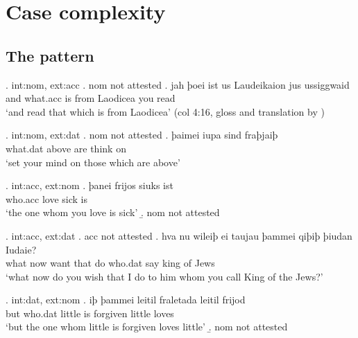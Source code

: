 
\chapter{Case complexity}

\section{The pattern}

\ex. \ac{int}:\ac{nom}, \ac{ext}:\ac{acc}
\a. \ac{nom} not attested
\bg. jah þoei ist us Laudeikaion jus ussiggwaid\\
 and what.\ac{acc} is\scsub{[nom]} from Laodicea you read\scsub{[acc]}\\
 `and read that which is from Laodicea' \hfill (\ac{col} 4:16, gloss and translation by \citealt[357]{harbert1978})

\ex. \ac{int}:\ac{nom}, \ac{ext}:\ac{dat}
\a. \ac{nom} not attested
\bg. þaimei iupa sind fraþjaiþ\\
 what.\ac{dat} above are\scsub{[nom]} {think on}\scsub{[dat]}\\
 `set your mind on those which are above' 

\ex. \ac{int}:\ac{acc}, \ac{ext}:\ac{nom}
\ag. þanei frijos siuks ist\\
 who.\ac{acc} love\scsub{[acc]} sick is\scsub{[nom]}\\
 `the one whom you love is sick' 
\b. \ac{nom} not attested

\ex. \ac{int}:\ac{acc}, \ac{ext}:\ac{dat}
\a. \ac{acc} not attested
\bg. hva nu wileiþ ei taujau þammei qiþiþ þiudan Iudaie?\\
 what now want that do\scsub{[dat]} who.\ac{dat} say\scsub{[acc]} king {of Jews}\\
 `what now do you wish that I do to him whom you call King of the Jews?' 

\ex. \ac{int}:\ac{dat}, \ac{ext}:\ac{nom}
\ag. iþ þammei leitil fraletada leitil frijod\\
 but who.\ac{dat} little {is forgiven\scsub{[dat]}} little loves\scsub{[nom]}\\
 `but the one whom little is forgiven loves little' 
\b. \ac{nom} not attested

